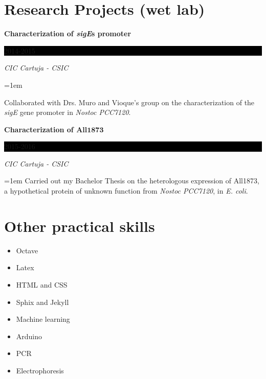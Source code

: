 \documentclass[paper=a4,fontsize=11pt]{article} %
\newlength{\spacebox}
\newcommand{\NewPart}[1]{\section*{
									{#1}}}
\newcommand{\PersonalEntry}[2]{
		\noindent\hangindent=2em\hangafter=0 %
		\parbox{\spacebox}{        %
		\textit{#1}}		       %
		\hspace{1.5em} #2 \par}    %
\newcommand{\EducationEntry}[4]{
		\noindent \textbf{#1} \hfill      %
		\colorbox{Black}{%
			\parbox{6em}{%
			\hfill\color{White}#2}} \par  %
		\noindent \textit{#3} \par        %
		\noindent\hangindent=1em\hangafter=0 \small #4 %
		\normalsize \par}
\newcommand{\VolunteeringEntry}[2]{      %
		\noindent\hangindent=2em\hangafter=0 %
		\parbox{\spacebox}{        %
		\textit{#1}}			   %
		\hspace{1.5em} #2 \par}    %
\begin{document}
		
\NewPart{Research Projects (wet lab)}{}

\EducationEntry{Characterization of \textit{sigE}\textquotesingle s promoter}{2014-2015}{CIC Cartuja - CSIC}{\begin{changemargin}{0cm}{3cm}Collaborated with Drs. Muro and Vioque's group on the characterization of the \textit{sigE} gene promoter in \textit{Nostoc PCC7120}.\end{changemargin}}

\EducationEntry{Characterization of All\begin{math}\boldsymbol{1873}\end{math}}{2015-2016}{CIC Cartuja - CSIC}{Carried out my Bachelor Thesis on the heterologous expression of All1873, a hypothetical protein of unknown function from \textit{Nostoc PCC7120}, in \textit{E. coli}.}


\NewPart{Other practical skills}


\begin{multicols}{4}

\begin{itemize}
\item Octave
\item Latex

\end{itemize}

\columnbreak

\begin{itemize}
\item HTML and CSS
\item Sphix and Jekyll
\end{itemize}

\columnbreak

\begin{itemize}
\item Machine learning
\item Arduino
\end{itemize}

\columnbreak

\begin{itemize}
\item PCR
\item Electrophoresis
\end{itemize}
\end{multicols}


\end{document}
